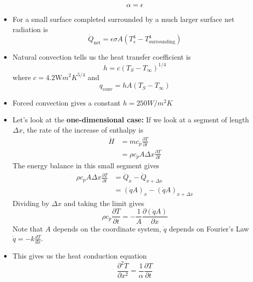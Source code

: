 \documentclass{article}
\begin{document}
\begin{itemize}
        \begin{equation}
            \alpha = \epsilon
        \end{equation}
        \item For a small surface completed surrounded by a much larger surface net radiation is 
        \begin{equation}
            \dot{Q}_\text{net} = \epsilon \sigma A (T_s^4 - T_\text{surrounding}^4)
        \end{equation}
        \item Natural convection tells us the heat transfer coefficient is
        \begin{equation}
            h = c(T_S-T_\infty)^{1/4}
        \end{equation}
        where $c=4.2 \text{W}{m^2 K^{5/4}}$ and 
        \begin{equation}
            q_\text{conv}  = hA(T_S-T_\infty)
        \end{equation}
        \item Forced convection gives a constant $h = 250 W/m^2 K$
        \item Let's look at the \textbf{one-dimensional case:} If we look at a segment of length $\Delta x$, the rate of the increase of enthalpy is
        \begin{align}
            \dot{H} &= mc_p \frac{\partial T}{\partial t} \\ 
            &= \rho c_p A \Delta x \frac{\partial T}{\partial t}
        \end{align}
        The energy balance in this small segment gives
        \begin{align}
            \rho c_p A\Delta x\frac{\partial T}{\partial t} &= \dot{Q}_x - \dot{Q}_{x+\Delta x} \\ 
            &= (\dot{q}A)_x - (\dot{q}A)_{x+\Delta x}
        \end{align}
        Dividing by $\Delta x$ and taking the limit gives 
        \begin{equation}
            \rho c_p \frac{\partial T}{\partial t} = -\frac{1}{A} \frac{\partial(\dot{q}A)}{\partial x}
        \end{equation}
        Note that $A$ depends on the coordinate system, $\dot{q}$ depends on Fourier's Law $\dot{q} = -k\frac{dT}{dx}$.
        \item This gives us the heat conduction equation 
        \begin{equation}
            \frac{\partial^2 T}{\partial x^2} = \frac{1}{\alpha}\frac{\partial T}{\partial t}  

\end{equation}
\end{itemize}
\end{document}
